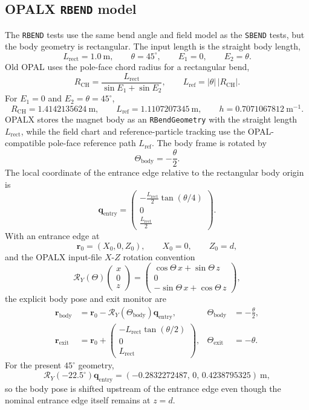 \documentclass[11pt]{article}
\newcommand{\degree}{^\circ}
\newcommand{\code}[1]{\texttt{#1}}
\newcommand{\vect}[1]{\boldsymbol{#1}}
\begin{document}
\subsection{OPALX \code{RBEND} model}

The \code{RBEND} tests use the same bend angle and field model as the
\code{SBEND} tests, but the body geometry is rectangular.  The input length is
the straight body length,
\[
  L_\mathrm{rect}=1.0\ \mathrm{m},\qquad
  \theta=45\degree,\qquad
  E_1=0,\qquad E_2=\theta .
\]
Old OPAL uses the pole-face chord radius for a rectangular bend,
\[
  R_\mathrm{CH} =
    \frac{L_\mathrm{rect}}{\sin E_1+\sin E_2},
  \qquad
  L_\mathrm{ref}=|\theta|\,|R_\mathrm{CH}|.
\]
For \(E_1=0\) and \(E_2=\theta=45\degree\),
\[
  R_\mathrm{CH}=1.4142135624\ \mathrm{m},\qquad
  L_\mathrm{ref}=1.1107207345\ \mathrm{m},\qquad
  h=0.7071067812\ \mathrm{m}^{-1}.
\]
OPALX stores the magnet body as an \code{RBendGeometry} with the straight
length \(L_\mathrm{rect}\), while the field chart and reference-particle
tracking use the OPAL-compatible pole-face reference path \(L_\mathrm{ref}\).
The body frame is rotated by
\[
  \Theta_\mathrm{body}=-\frac{\theta}{2}.
\]
The local coordinate of the entrance edge relative to the rectangular body
origin is
\[
  \vect q_\mathrm{entry}
    =
    \begin{pmatrix}
      -\frac{L_\mathrm{rect}}{2}\tan(\theta/4)\\
      0\\
      \frac{L_\mathrm{rect}}{2}
    \end{pmatrix}.
\]
With an entrance edge at
\[
  \vect r_0=(X_0,0,Z_0),\qquad X_0=0,\qquad Z_0=d,
\]
and the OPALX input-file \(X\)-\(Z\) rotation convention
\[
  \mathcal R_Y(\Theta)
    \begin{pmatrix}x\\0\\z\end{pmatrix}
  =
    \begin{pmatrix}
      \cos\Theta\,x+\sin\Theta\,z\\
      0\\
      -\sin\Theta\,x+\cos\Theta\,z
    \end{pmatrix},
\]
the explicit body pose and exit monitor are
\[
\begin{aligned}
  \vect r_\mathrm{body}
    &= \vect r_0 - \mathcal R_Y(\Theta_\mathrm{body})\vect q_\mathrm{entry},
  &
  \Theta_\mathrm{body} &= -\frac{\theta}{2},\\[1.0ex]
  \vect r_\mathrm{exit}
    &= \vect r_0 +
       \begin{pmatrix}
         -L_\mathrm{rect}\tan(\theta/2)\\
         0\\
         L_\mathrm{rect}
       \end{pmatrix},
  &
  \Theta_\mathrm{exit} &= -\theta .
\end{aligned}
\]
For the present \(45\degree\) geometry,
\[
  \mathcal R_Y(-22.5\degree)\vect q_\mathrm{entry}
    = (-0.2832272487,\,0,\,0.4238795325)\ \mathrm{m},
\]
so the body pose is shifted upstream of the entrance edge even though the
nominal entrance edge itself remains at \(z=d\).
\end{document}
